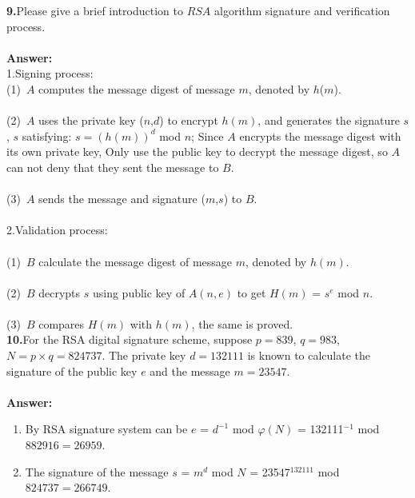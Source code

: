 \documentclass[paper=a4, fontsize=11pt]{scrartcl} %
\numberwithin{equation}{section} %
\numberwithin{figure}{section} %
\numberwithin{table}{section} %
\begin{document}
\textbf{9.}Please give a brief introduction to $RSA$ algorithm signature and verification process.
\\
\\
\textbf{Answer:}\\
\noindent 1.Signing process:\\
\hspace*{0.5cm}(1)\ $A$ computes the message digest of message $m$, denoted by $h$($m$).  \\
\\
\hspace*{0.5cm}(2)\ $A$ uses the private key ($n$,$d$) to encrypt $h(m)$, and generates the signature $s$, $s$ satisfying: $s = (h(m))^ d$ mod $n$; Since $A$ encrypts the message digest with its own private key, Only use the public key to decrypt the message digest, so $A$ can not deny that they sent the message to $B$.  \\
\\
\hspace*{0.5cm}(3)\ $A$ sends the message and signature ($m$,$s$) to $B$.   \\
\\
\noindent 2.Validation process:\\
\\
\hspace*{0.5cm}(1)\ $B$ calculate the message digest of message $m$, denoted by $h(m)$.  \\
\\
\hspace*{0.5cm}(2)\ $B$ decrypts $s$ using public key of $A(n,e)$ to get $H(m)$ = $s ^ e$ mod $n$.  \\
\\
\hspace*{0.5cm}(3)\ $B$ compares $H(m)$ with $h(m)$, the same is proved.   \\

\textbf{10.}For the RSA digital signature scheme, suppose $p = 839$, $q = 983$, $N = p\times q = 824737$. The private key $d = 132111$ is known to calculate the signature of the public key $e$ and the message $m = 23547$.
\\
\\
\textbf{Answer:}
\begin{enumerate}
\item By RSA signature system can be $e$ = $d^{-1}$ mod $ \varphi(N)$ = 132111$^{-1}$ mod $882916=26959$.
\item The signature of the message $s$ = $m^d$ mod $N$ = 23547$^{132111}$ mod $824737=266749$.
\end{enumerate}
\end{document}
